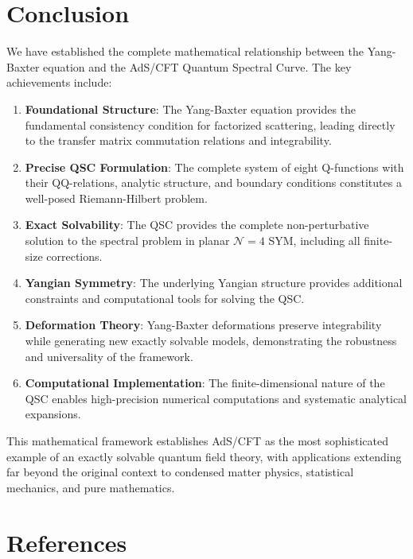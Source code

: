 \documentclass[11pt]{article}
\begin{document}
\section{Conclusion}

We have established the complete mathematical relationship between the Yang-Baxter equation and the AdS/CFT Quantum Spectral Curve. The key achievements include:

\begin{enumerate}
\item \textbf{Foundational Structure}: The Yang-Baxter equation provides the fundamental consistency condition for factorized scattering, leading directly to the transfer matrix commutation relations and integrability.

\item \textbf{Precise QSC Formulation}: The complete system of eight Q-functions with their QQ-relations, analytic structure, and boundary conditions constitutes a well-posed Riemann-Hilbert problem.

\item \textbf{Exact Solvability}: The QSC provides the complete non-perturbative solution to the spectral problem in planar $\mathcal{N}=4$ SYM, including all finite-size corrections.

\item \textbf{Yangian Symmetry}: The underlying Yangian structure provides additional constraints and computational tools for solving the QSC.

\item \textbf{Deformation Theory}: Yang-Baxter deformations preserve integrability while generating new exactly solvable models, demonstrating the robustness and universality of the framework.

\item \textbf{Computational Implementation}: The finite-dimensional nature of the QSC enables high-precision numerical computations and systematic analytical expansions.
\end{enumerate}

This mathematical framework establishes AdS/CFT as the most sophisticated example of an exactly solvable quantum field theory, with applications extending far beyond the original context to condensed matter physics, statistical mechanics, and pure mathematics.

\section*{References}
\end{document}
